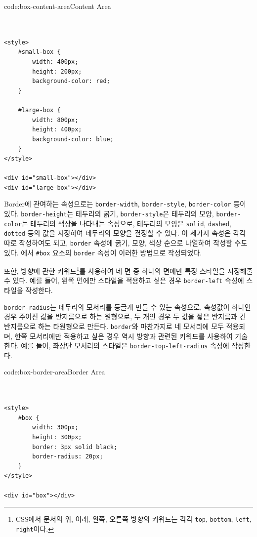 \begin{codeenv}{code:box-content-area}{Content Area}\begin{verbatim}


<style>
    #small-box {
        width: 400px;
        height: 200px;
        background-color: red;
    }

    #large-box {
        width: 800px;
        height: 400px;
        background-color: blue;
    }
</style>

<div id="small-box"></div>
<div id="large-box"></div>
\end{verbatim}
\end{codeenv}

Border에 관여하는 속성으로는 \texttt{border-width}, \texttt{border-style}, \texttt{border-color} 등이 있다. \texttt{border-height}는 테두리의 굵기, \texttt{border-style}은 테두리의 모양, \texttt{border-color}는 테두리의 색상을 나타내는 속성으로, 테두리의 모양은 \texttt{solid}, \texttt{dashed}, \texttt{dotted} 등의 값을 지정하여 테두리의 모양을 결정할 수 있다. 이 세가지 속성은 각각 따로 작성하여도 되고, \texttt{border} 속성에 굵기, 모양, 색상 순으로 나열하여 작성할 수도 있다. 에서 \texttt{\#box} 요소의 \texttt{border} 속성이 이러한 방법으로 작성되었다. 

또한, 방향에 관한 키워드\footnote{CSS에서 문서의 위, 아래, 왼쪽, 오른쪽 방향의 키워드는 각각 \texttt{top}, \texttt{bottom}, \texttt{left}, \texttt{right}이다.}를 사용하여 네 면 중 하나의 면에만 특정 스타일을 지정해줄 수 있다. 예를 들어, 왼쪽 면에만 스타일을 적용하고 싶은 경우 \texttt{border-left} 속성에 스타일을 작성한다.

\texttt{border-radius}는 테두리의 모서리를 둥글게 만들 수 있는 속성으로, 속성값이 하나인 경우 주어진 값을 반지름으로 하는 원형으로, 두 개인 경우 두 값을 짧은 반지름과 긴 반지름으로 하는 타원형으로 만든다. \texttt{border}와 마찬가지로 네 모서리에 모두 적용되며, 한쪽 모서리에만 적용하고 싶은 경우 역시 방향과 관련된 키워드를 사용하여 기술한다. 예를 들어, 좌상단 모서리의 스타일은 \texttt{border-top-left-radius} 속성에 작성한다.

\begin{codeenv}{code:box-border-area}{Border Area}\begin{verbatim}


<style>
    #box {
        width: 300px;
        height: 300px;
        border: 3px solid black;
        border-radius: 20px;
    }
</style>

<div id="box"></div>
\end{verbatim}
\end{codeenv}

